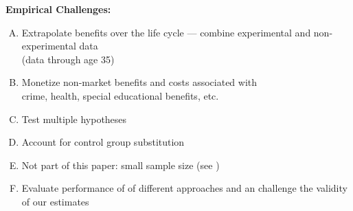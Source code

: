 \documentclass[static]{JJH-Beamer}
\begin{document}
\begin{frame}

\begin{center}
\textbf{Empirical Challenges:}
\end{center}

\begin{enumerate}[(A)]
\item Extrapolate benefits over the life cycle --- combine experimental and non-experimental data \\(data through age 35)
\item Monetize non-market benefits and costs associated with \\ crime, health, special educational benefits, etc.
\item Test multiple hypotheses
\item Account for control group substitution
\item Not part of this paper: small sample size (see \citealp{Campbell_Conti_etal_2014_EarlyChildhoodInvestments})
\item Evaluate performance of of different approaches and an challenge the validity of our estimates
\end{enumerate}

\end{frame}
\end{document}

